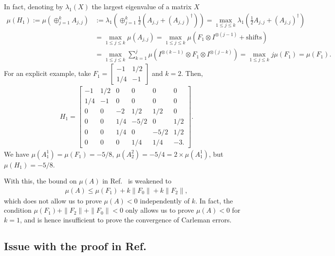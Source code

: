 \documentclass[superscriptaddress,onecolumn,nofootinbib,longbibliography,a4paper,accepted=2026-09-29]{quantumarticle}
\theoremstyle{plain}
\theoremstyle{definition}
\numberwithin{thm}{section}
\numberwithin{assumption}{section}
\numberwithin{lemma}{section}
\numberwithin{prop}{section}
\numberwithin{cor}{section}
\numberwithin{definition}{section}
\numberwithin{rmk}{section}
\numberwithin{equation}{section}
\begin{document}
In fact, denoting by $\lambda_1(X)$ the largest eigenvalue of a matrix $X$
    \begin{align}
    \mu(H_1):=\mu \left ( \oplus_{j=1}^{k} A_{j,j}\right) &:= \lambda_1 \left ( \oplus_{j=1}^{k} \frac{1}{2}(A_{j,j}+(A_{j,j})^\dagger)\right) \nonumber 
    = \max_{1\le j \le k} \lambda_1 \left (  \frac{1}{2}A_{j,j}+(A_{j,j})^\dagger \right) \nonumber \\
& = \max_{1\le j \le k} \mu(A_{j,j})
= \max_{1\le j \le k} \mu(F_1 \otimes I^{\otimes (j-1)} + \mathrm{shifts})
 \nonumber  \\ & = \max_{1\le j \le k} \sum_{k=1}^j \mu(I^{\otimes (k-1)} \otimes F_1 \otimes I^{\otimes (j-k)})
     =  \max_{1\le j \le k} j\mu \left ( F_1\right)
          = \mu \left ( F_1\right).
\end{align}
For an explicit example, take $F_1 =  \left[\begin{smallmatrix}
 -1 & 1/2 \\ 1/4 & -1
\end{smallmatrix}\right]$ and $k =2$. Then,
\begin{align}
    H_1 =  \left[\begin{smallmatrix}
 -1 & 1/2 & 0 & 0 &0 &0  \\ 
 1/4 & -1  & 0 & 0 &0 &0  \\
 0 & 0   & -2 & 1/2 & 1/2 & 0 \\
  0 & 0  & 1/4 & -5/2 & 0 & 1/2 \\
    0 & 0 & 1/4 & 0 & -5/2 & 1/2 \\
      0 & 0 & 0 & 1/4 & 1/4 & -3.
\end{smallmatrix}\right].
\end{align}
We have $\mu(A^1_1) = \mu(F_1) = -5/8$, $\mu(A^2_2) = -5/4 = 2 \times  \mu(A^1_1)$, but $\mu(H_1) = -5/8$. 

With this, the bound on $\mu(A)$ in Ref.~\cite{krovi2023improved} is weakened to
\begin{align}
    \mu(A) \leq \mu(F_1) + k \|F_0\| + k \| F_2\|,
\end{align}
which does not allow us to prove $\mu(A) <0$ independently of $k$. In fact, the condition $\mu(F_1) + \| F_2\| + \|F_0\| <0 $ only allows us to prove $ \mu(A) < 0$ for $k = 1$, and is hence insufficient to prove the convergence of Carleman errors.


\subsection{Issue with the proof in \texorpdfstring{Ref.~\cite{wu2024quantum}}{arXiv:2405.12714}}
\label{app:issuenonresonant}
\end{document}
